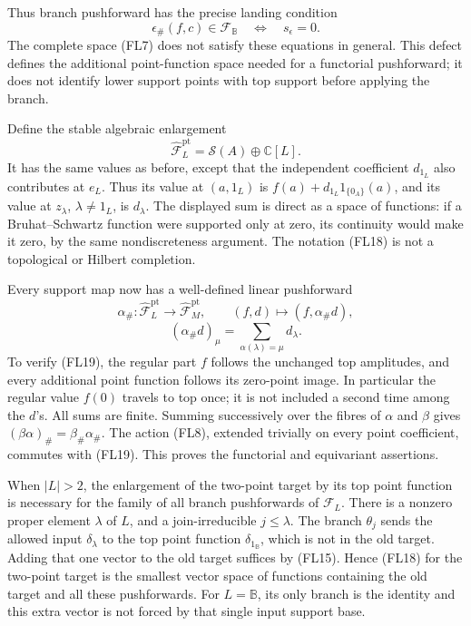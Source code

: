 \documentclass[
  10pt,
]{article}
\begin{document}
Thus branch pushforward has the precise landing condition \[
\epsilon_\#(f,c)\in\mathcal F_{\mathbb B}
\quad\Longleftrightarrow\quad s_\epsilon=0.
\tag{FL17}
\] The complete space (FL7) does not satisfy these equations in general.
This defect defines the additional point-function space needed for a
functorial pushforward; it does not identify lower support points with
top support before applying the branch.

Define the stable algebraic enlargement \[
\widehat{\mathcal F}_L^{\mathrm{pt}}
=\mathcal S(A)\oplus\mathbb C[L].
\tag{FL18}
\] It has the same values as before, except that the independent
coefficient \(d_{1_L}\) also contributes at \(e_L\). Thus its value at
\((a,1_L)\) is \(f(a)+d_{1_L}1_{\{0_A\}}(a)\), and its value at
\(z_\lambda\), \(\lambda\ne1_L\), is \(d_\lambda\). The displayed sum is
direct as a space of functions: if a Bruhat--Schwartz function were
supported only at zero, its continuity would make it zero, by the same
nondiscreteness argument. The notation (FL18) is not a topological or
Hilbert completion.

Every support map now has a well-defined linear pushforward \[
\alpha_\#:\widehat{\mathcal F}_L^{\mathrm{pt}}
\longrightarrow\widehat{\mathcal F}_M^{\mathrm{pt}},
\qquad
(f,d)\longmapsto(f,\alpha_\#d),
\] \[
(\alpha_\#d)_\mu=\sum_{\alpha(\lambda)=\mu}d_\lambda.
\tag{FL19}
\] To verify (FL19), the regular part \(f\) follows the unchanged top
amplitudes, and every additional point function follows its zero-point
image. In particular the regular value \(f(0)\) travels to top once; it
is not included a second time among the \(d\)'s. All sums are finite.
Summing successively over the fibres of \(\alpha\) and \(\beta\) gives
\((\beta\alpha)_\#=\beta_\#\alpha_\#\). The action (FL8), extended
trivially on every point coefficient, commutes with (FL19). This proves
the functorial and equivariant assertions.

When \(|L|>2\), the enlargement of the two-point target by its top point
function is necessary for the family of all branch pushforwards of
\(\mathcal F_L\). There is a nonzero proper element \(\lambda\) of
\(L\), and a join-irreducible \(j\le\lambda\). The branch \(\theta_j\)
sends the allowed input \(\delta_\lambda\) to the top point function
\(\delta_{1_{\mathbb B}}\), which is not in the old target. Adding that
one vector to the old target suffices by (FL15). Hence (FL18) for the
two-point target is the smallest vector space of functions containing
the old target and all these pushforwards. For \(L=\mathbb B\), its only
branch is the identity and this extra vector is not forced by that
single input support base.
\end{document}
